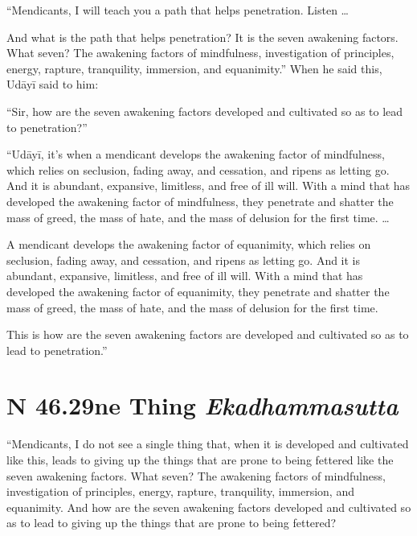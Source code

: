 \documentclass[12pt,openany]{book}%
\newcommand*{\suttatitleacronym}[1]{\smaller[2]{#1}\vspace*{.3em}}
\newcommand*{\suttatitletranslation}[1]{\linebreak{#1}}
\newcommand*{\suttatitleroot}[1]{\linebreak\smaller[2]\itshape{#1}}
\newcommand*{\tocacronym}[1]{\hspace*{-3.3em}{#1}\quad}
\newcommand*{\toctranslation}[1]{#1}
\newcommand*{\tocroot}[1]{(\textit{#1})}
\begin{document}
“Mendicants, I will teach you a path that helps penetration. Listen … 

And what is the path that helps penetration? It is the seven awakening factors. What seven? The awakening factors of mindfulness, investigation of principles, energy, rapture, tranquility, immersion, and equanimity.” When he said this, \textsanskrit{Udāyī} said to him: 

“Sir, how are the seven awakening factors developed and cultivated so as to lead to penetration?” 

“\textsanskrit{Udāyī}, it’s when a mendicant develops the awakening factor of mindfulness, which relies on seclusion, fading away, and cessation, and ripens as letting go. And it is abundant, expansive, limitless, and free of ill will. With a mind that has developed the awakening factor of mindfulness, they penetrate and shatter the mass of greed, the mass of hate, and the mass of delusion for the first time. … 

A mendicant develops the awakening factor of equanimity, which relies on seclusion, fading away, and cessation, and ripens as letting go. And it is abundant, expansive, limitless, and free of ill will. With a mind that has developed the awakening factor of equanimity, they penetrate and shatter the mass of greed, the mass of hate, and the mass of delusion for the first time. 

This is how are the seven awakening factors are developed and cultivated so as to lead to penetration.” 

%
\section*{{\suttatitleacronym SN 46.29}{\suttatitletranslation One Thing }{\suttatitleroot Ekadhammasutta}}
\addcontentsline{toc}{section}{\tocacronym{SN 46.29} \toctranslation{One Thing } \tocroot{Ekadhammasutta}}

“Mendicants, I do not see a single thing that, when it is developed and cultivated like this, leads to giving up the things that are prone to being fettered like the seven awakening factors. What seven? The awakening factors of mindfulness, investigation of principles, energy, rapture, tranquility, immersion, and equanimity. And how are the seven awakening factors developed and cultivated so as to lead to giving up the things that are prone to being fettered? 
\end{document}
